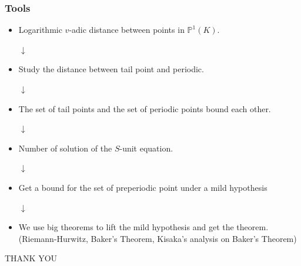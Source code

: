 \documentclass{beamer}
\def\PP{{\mathbb P}}
\theoremstyle{thmstyle}
\theoremstyle{mystyle}
\theoremstyle{qstnstyle}
\begin{document}
\begin{frame}
\frametitle{Tools}
\begin{itemize}
\item Logarithmic $v$-adic distance between points in $\PP^1(K)$.

\begin{center}
{\huge{$\downarrow$}}
\end{center}
\pause
\item Study the distance between tail point and periodic.

\begin{center}
{\huge{$\downarrow$}}
\end{center}
\pause
\item The set of tail points and the set of periodic points bound each other.

\begin{center}
{\huge{$\downarrow$}}
\end{center}
\pause
\item Number of solution of the $S$-unit equation.
\begin{center}
{\huge{$\downarrow$}}
\end{center}
\pause
\item Get a bound for the set of preperiodic point under a mild hypothesis
\begin{center}
{\huge{$\downarrow$}}
\end{center}
\pause
\item We use big theorems to lift the mild hypothesis and get the theorem. \\ (Riemann-Hurwitz, Baker's Theorem, Kisaka's analysis on Baker's Theorem)


\end{itemize}
\end{frame}

\begin{frame}
\begin{center}
{\Huge{THANK YOU}}
\end{center}


\end{frame}
\end{document}
